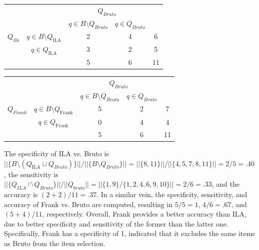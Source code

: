 \documentclass[12pt, a4paper, titilepage]{article}
\begin{document}
	\begin{center} %
		\begin{tabular}{c |c| c c| c|}
		\multicolumn{2}{c}{}	& \multicolumn{2}{c}{$Q_{Bruto}$} & \multicolumn{1}{c}{} \\
\cline{3-4}
\multicolumn{2}{c}{} & \multicolumn{
	1}{|c}{$q \in B \setminus Q_{Bruto}$} & \multicolumn{
	1}{c|}{$q \in Q_{Bruto}$}& \multicolumn{1}{c}{} \\	
\cline{2-5}   
			$Q_{Ila}$ & $q \in B \setminus Q_{\text{ILA}}$ & 2 & 4 &  6\\
			& $q \in Q_{\text{ILA}}$ & 3 & 2 & 5 \\
			\cline{2-5}
			& & 5& 6 & 11\\
			\cline{2-5}
		\end{tabular}
	\end{center}


	\begin{center} %
		\begin{tabular}{c |c| c c| c|}
		\multicolumn{2}{c}{}	& \multicolumn{2}{c}{$Q_{Bruto}$} & \multicolumn{1}{c}{}\\
\cline{3-4}
\multicolumn{2}{c}{} & \multicolumn{
	1}{|c}{$q \in B \setminus Q_{Bruto}$} & \multicolumn{
	1}{c|}{$q \in Q_{Bruto}$}& \multicolumn{1}{c}{} \\	
\cline{2-5}    
			$Q_{Frank}$ & $q \in B \setminus Q_{\text{Frank}}$ & 5 & 2 & 7  \\
			& $q \in Q_{\text{Frank}}$  & 0 & 4 & 4\\
			\cline{2-5}
			& & 5& 6 & 11 \\
				\cline{2-5}
		\end{tabular}
	\end{center}

The specificity of ILA vs. Bruto is \\ $||\{B \setminus (Q_{\text{ILA}} \cup Q_{Bruto})\}||/||\{B \setminus Q_{Bruto}\}|| = ||\{8,11\}||/||\{4,5,7,8,11\}|| = 2/5 = .40$, the sensitivity is $||\{Q_{ILA} \cap Q_{Bruto}\}||/ ||Q_{bruto}|| = ||\{1,9\}/\{1,2,4,6,9,10\}|| = 2/6 = .33$, and the accuracy is $(2+2)/11 = .37$. In a similar vein, the specificity, sensitivity, and accuracy of Frank vs. Bruto are computed, resulting in $5/5 = 1$, $4/6 = .67$, and $(5+4)/11$, respectively. Overall, Frank provides a better accuracy than ILA, due to better specificity and sensitivity of the former than the latter one. Specifically, Frank has a specificity of 1, indicated that it excludes the same items as Bruto from the item selection.
 
\end{document}
